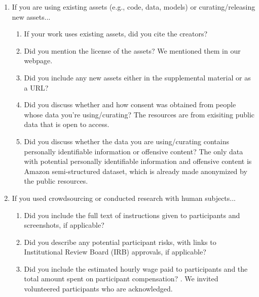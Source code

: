\documentclass{article}
\begin{document}
\begin{enumerate}
\item If you are using existing assets (e.g., code, data, models) or curating/releasing new assets...
\begin{enumerate}
  \item If your work uses existing assets, did you cite the creators?
    \answerYes{}
  \item Did you mention the license of the assets?
    \answerYes{} We mentioned them in our webpage.
  \item Did you include any new assets either in the supplemental material or as a URL?
    \answerYes{}
  \item Did you discuss whether and how consent was obtained from people whose data you're using/curating?
    \answerYes{} The resources are from exisiting public data that is open to access.
  \item Did you discuss whether the data you are using/curating contains personally identifiable information or offensive content?
    \answerYes{} The only data with potential personally identifiable information and offensive content is Amazon semi-structured dataset, which is already made anonymized by the public resources.
\end{enumerate}

\item If you used crowdsourcing or conducted research with human subjects...
\begin{enumerate}
  \item Did you include the full text of instructions given to participants and screenshots, if applicable?
    \answerYes{}
  \item Did you describe any potential participant risks, with links to Institutional Review Board (IRB) approvals, if applicable?
    \answerNA{}
  \item Did you include the estimated hourly wage paid to participants and the total amount spent on participant compensation?
    \answerNA{}. We invited volunteered participants who are acknowledged.
    \end{enumerate}

\end{enumerate}

\clearpage

\appendix

\clearpage
\end{document}

